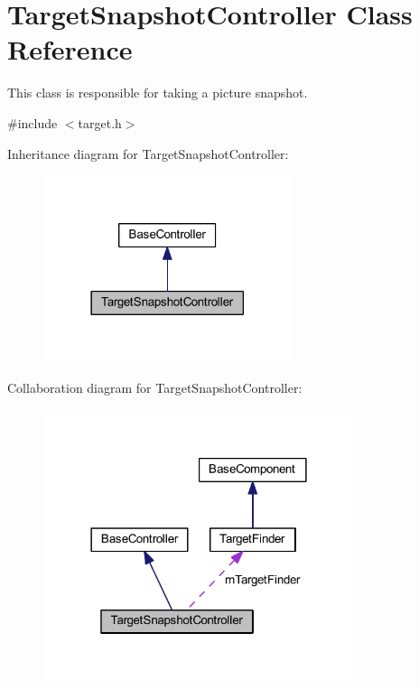 \hypertarget{class_target_snapshot_controller}{\section{\-Target\-Snapshot\-Controller \-Class \-Reference}
\label{class_target_snapshot_controller}
}


\-This class is responsible for taking a picture snapshot.  




{\ttfamily \#include $<$target.\-h$>$}



\-Inheritance diagram for \-Target\-Snapshot\-Controller\-:\nopagebreak
\begin{figure}[H]
\begin{center}
\leavevmode
\includegraphics[width=206pt]{class_target_snapshot_controller__inherit__graph}
\end{center}
\end{figure}


\-Collaboration diagram for \-Target\-Snapshot\-Controller\-:\nopagebreak
\begin{figure}[H]
\begin{center}
\leavevmode
\includegraphics[width=258pt]{class_target_snapshot_controller__coll__graph}
\end{center}
\end{figure}
